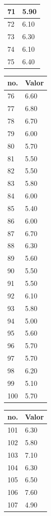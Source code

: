 \begin{table}[!ht]
\begin{tabular}{ |l|l| }
71	&	5.90	\\ \hline
72	&	6.10	\\ \hline
73	&	6.30	\\ \hline
74	&	6.10	\\ \hline
75	&	6.40	\\ \hline
\end{tabular}
\begin{tabular}{ |l|l| }
\hline
 no. & Valor \\ \hline
76	&	6.60	\\ \hline
77	&	6.80	\\ \hline
78	&	6.70	\\ \hline
79	&	6.00	\\ \hline
80	&	5.70	\\ \hline
81	&	5.50	\\ \hline
82	&	5.50	\\ \hline
83	&	5.80	\\ \hline
84	&	6.00	\\ \hline
85	&	5.40	\\ \hline
86	&	6.00	\\ \hline
87	&	6.70	\\ \hline
88	&	6.30	\\ \hline
89	&	5.60	\\ \hline
90	&	5.50	\\ \hline
91	&	5.50	\\ \hline
92	&	6.10	\\ \hline
93	&	5.80	\\ \hline
94	&	5.00	\\ \hline
95	&	5.60	\\ \hline
96	&	5.70	\\ \hline
97	&	5.70	\\ \hline
98	&	6.20	\\ \hline
99	&	5.10	\\ \hline
100	&	5.70	\\ \hline
\end{tabular}
\begin{tabular}{ |l|l| }
\hline
 no. & Valor \\ \hline
101	&	6.30	\\ \hline
102	&	5.80	\\ \hline
103	&	7.10	\\ \hline
104	&	6.30	\\ \hline
105	&	6.50	\\ \hline
106	&	7.60	\\ \hline
107	&	4.90	\\ \hline

\end{tabular}
\end{table}
